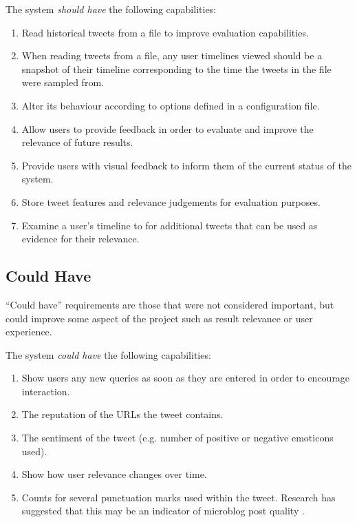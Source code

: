 \documentclass{l4proj}
\begin{document}
        The system \textit{should have} the following capabilities:
        
        \begin{enumerate}[label=\textbf{S.\arabic*}]
        \item Read historical tweets from a file to improve evaluation capabilities.
        \item When reading tweets from a file, any user timelines viewed should be a snapshot of their timeline corresponding to the time the tweets in the file were sampled from.
        \item Alter its behaviour according to options defined in a configuration file.
        \item Allow users to provide feedback in order to evaluate and improve the relevance of future results.
        \item Provide users with visual feedback to inform them of the current status of the system.
        \item Store tweet features and relevance judgements for evaluation purposes.
        \item Examine a user's timeline to for additional tweets that can be used as evidence for their relevance.
        \end{enumerate}

        \subsection{Could Have}
        ``Could have'' requirements are those that were not considered important, but could improve some aspect of the project such as result relevance or user experience.
        
        The system \textit{could have} the following capabilities:
        
        \begin{enumerate}[label=\textbf{C.\arabic*}]
        \item Show users any new queries as soon as they are entered in order to encourage interaction.
        \item The reputation of the URLs the tweet contains.
        \item The sentiment of the tweet (e.g. number of positive or negative emoticons used).
        \item Show how user relevance changes over time.
        \item Counts for several punctuation marks used within the tweet. Research has suggested that this may be an indicator of microblog post quality \cite{Vosecky2012}.
        \end{enumerate}
        
\end{document}

